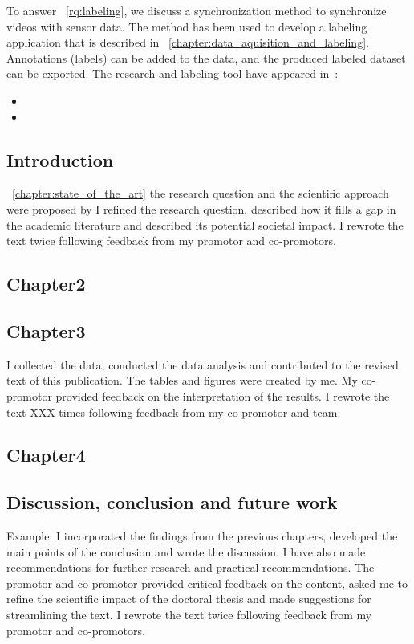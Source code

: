 
To answer \rqname~\ref{rq:labeling}, we discuss a synchronization method to synchronize videos with sensor data.
The method has been used to develop a labeling application that is described in \chaptername~\ref{chapter:data_aquisition_and_labeling}.
Annotations (labels) can be added to the data, and the produced labeled dataset can be exported.
The research and labeling tool have appeared in~\cite{Kamminga_2019_DATA_labeling_sync, Matlab_labeling_github}:

\begin{itemize}
\footnotesize
    \item[\cite{Kamminga_2019_DATA_labeling_sync}] 
    \item[\cite{Matlab_labeling_github}] 
\end{itemize}

\subsection{Introduction}
\chaptername~\ref{chapter:state_of_the_art} the research question and the scientific approach were proposed by 
I refined the research question, described how it fills a gap in the academic literature and described its potential societal impact. 
I rewrote the text twice following feedback from my promotor and co-promotors.
\subsection{Chapter2}
\subsection{Chapter3}
    I collected the data, conducted the data analysis and contributed to the revised text of this publication.
    The tables and figures were created by me.
    My co-promotor provided feedback on the interpretation of the results. 
    I rewrote the text XXX-times following feedback from my co-promotor and team.
\subsection{Chapter4}
\subsection{Discussion, conclusion and future work}
    Example: I incorporated the findings from the previous chapters, developed the
    main points of the conclusion and wrote the discussion. I have also made recommendations
    for further research and practical recommendations. The promotor and
    co-promotor provided critical feedback on the content, asked me to refine the
    scientific impact of the doctoral thesis and made suggestions for streamlining the
    text. I rewrote the text twice following feedback from my promotor and co-promotors.
